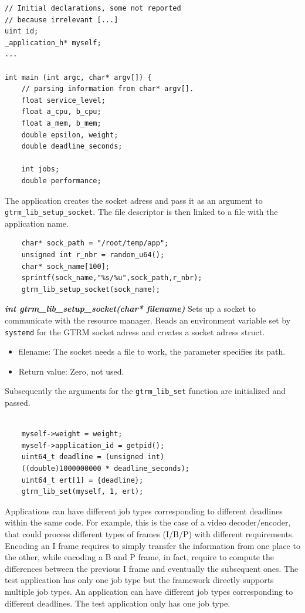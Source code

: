 \documentclass[nobiblatex]{LTHthesis}
\begin{document}
\begin{lstlisting}
// Initial declarations, some not reported
// because irrelevant [...]
uint id;
_application_h* myself;
...	

int main (int argc, char* argv[]) {
	// parsing information from char* argv[].
	float service_level;
	float a_cpu, b_cpu;
	float a_mem, b_mem;
	double epsilon, weight;
	double deadline_seconds;
	
	int jobs;
	double performance;
\end{lstlisting}

The application creates the socket adress and pass it as an argument to 
\texttt{gtrm\_lib\_setup\_socket}. The file descriptor is then linked to
a file with the application name.
\begin{lstlisting}
	char* sock_path = "/root/temp/app";
	unsigned int r_nbr = random_u64();
	char* sock_name[100];
	sprintf(sock_name,"%s/%u",sock_path,r_nbr);
	gtrm_lib_setup_socket(sock_name);
\end{lstlisting}

\begin{framed}
	\begin{flushleft}		
		\emph{\textbf{{int gtrm\_lib\_setup\_socket(char* filename)}}}
		Sets up a socket to communicate with the resource manager. 
    Reads an environment variable set by \texttt{systemd} for the GTRM
    socket adress and creates a socket adress struct.
		\begin{itemize}
		\item filename: The socket needs a file to work, the parameter 
      specifies its path.
		\item Return value: Zero, not used.
		\end{itemize}
	\end{flushleft}
\end{framed}

Subsequently the arguments for the \texttt{gtrm\_lib\_set} function
are initialized and passed.
\begin{lstlisting}	

	myself->weight = weight;
	myself->application_id = getpid();
	uint64_t deadline = (unsigned int) 
    ((double)1000000000 * deadline_seconds);
	uint64_t ert[1] = {deadline};
	gtrm_lib_set(myself, 1, ert);
\end{lstlisting}
Applications can have different job types corresponding to different 
deadlines within the same code. For example, this is the case of a video
decoder/encoder, that could process different types of frames (I/B/P)
with different requirements. Encoding an I frame requires to simply
transfer the information from one place to the other, while encoding a B and
P frame, in fact, require to compute the differences between the previous
I frame and eventually the subsequent ones. The test application has 
only one job type but the framework directly supports multiple job types. 
An application can have different job types corresponding to different deadlines. The test application only has one job type. 
\end{document}
